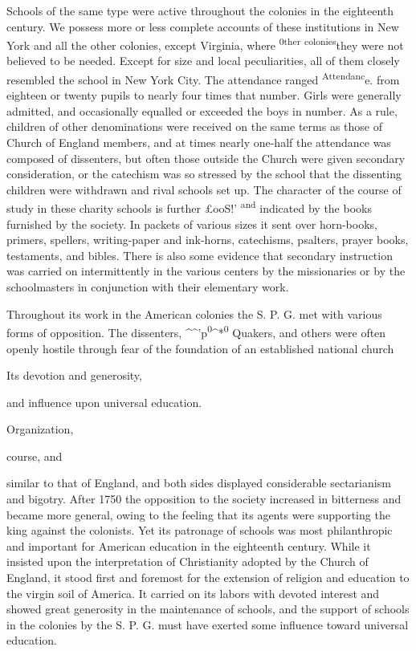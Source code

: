 \documentclass[]{book}
\begin{document}
Schools of the same type were active throughout the colonies in the eighteenth century. We possess more or less complete accounts of these institutions in New York and all the other colonies, except Virginia, where \textsuperscript{0ther} \textsuperscript{colonies}they were not believed to be needed. Except for size and local peculiarities, all of them closely resembled the school in New York City. The attendance ranged \textsuperscript{Attendanc}e. from eighteen or twenty pupils to nearly four times that number. Girls were generally admitted, and occasionally equalled or exceeded the boys in number. As a rule, children of other denominations were received on the same terms as those of Church of England members, and at times nearly one-half the attendance was composed of dissenters, but often those outside the Church were given secondary consideration, or the catechism was so stressed by the school that the dissenting children were withdrawn and rival schools set up. The character of the course of study in these charity schools is further £ooS!' \textsuperscript{and} indicated by the books furnished by the society. In packets of various sizes it sent over horn-books, primers, spellers, writing-paper and ink-horns, catechisms, psalters, prayer books, testaments, and bibles. There is also some evidence that secondary instruction was carried on intermittently in the various centers by the missionaries or by the schoolmasters in conjunction with their elementary work.

Throughout its work in the American colonies the S. P. G. met with various forms of opposition. The dissenters, \^{}\^{}'p\textsuperscript{0}\^{}*\textsuperscript{0} Quakers, and others were often openly hostile through fear of the foundation of an established national church

Its devotion and generosity,

and influence upon universal education.

Organization,

course, and

similar to that of England, and both sides displayed considerable sectarianism and bigotry. After 1750 the opposition to the society increased in bitterness and became more general, owing to the feeling that its agents were supporting the king against the colonists. Yet its patronage of schools was most philanthropic and important for American education in the eighteenth century. While it insisted upon the interpretation of Christianity adopted by the Church of England, it stood first and foremost for the extension of religion and education to the virgin soil of America. It carried on its labors with devoted interest and showed great generosity in the maintenance of schools, and the support of schools in the colonies by the S. P. G. must have exerted some influence toward universal education.
\end{document}
